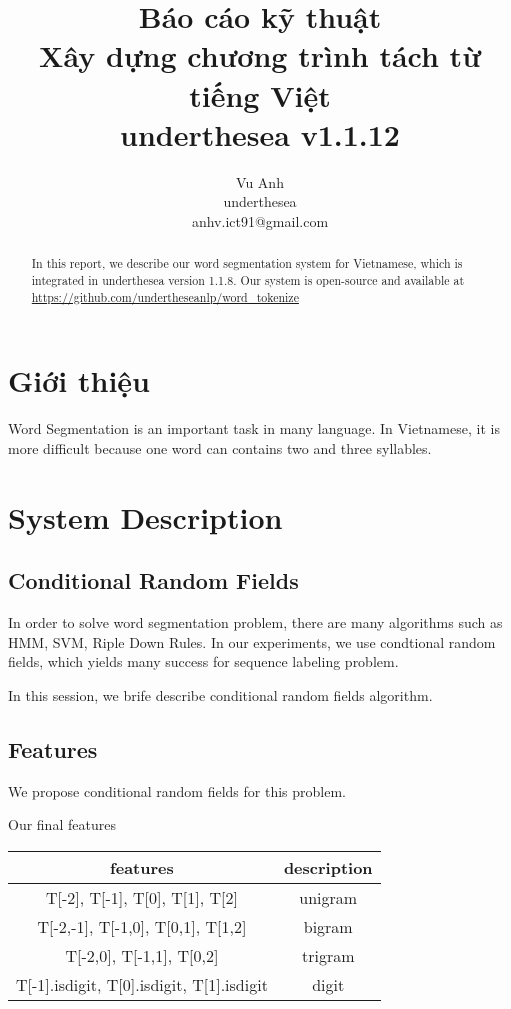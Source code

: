\documentclass[11pt,a4paper]{article}
\title{Báo cáo kỹ thuật\\ Xây dựng chương trình tách từ tiếng Việt \\ underthesea v1.1.12}
\author{
Vu Anh\\
underthesea\\
anhv.ict91@gmail.com
}
\date{}
\begin{document}
\maketitle
\begin{abstract}
In this report, we describe our word segmentation system for Vietnamese, which is integrated in underthesea version 1.1.8.
Our system is open-source and available at \url{https://github.com/undertheseanlp/word_tokenize}

\end{abstract}

\section{Giới thiệu}

Word Segmentation is an important task in many language. In Vietnamese, it is more difficult because one word can contains two and three syllables.


\section{System Description}

\subsection{Conditional Random Fields}

In order to solve word segmentation problem, there are many algorithms such as HMM, SVM, Riple Down Rules. In our experiments, we use condtional random fields, which yields many success for sequence labeling problem.

In this session, we brife describe conditional random fields algorithm.


\subsection{Features}
We propose conditional random fields for this problem.

Our final features
\begin{center}
\begin{tabular}{ |c|c| }
 \hline
 features & description \\
 \hline
 T[-2], T[-1], T[0], T[1], T[2] & unigram  \\
 T[-2,-1], T[-1,0], T[0,1], T[1,2] & bigram  \\
 T[-2,0], T[-1,1], T[0,2] & trigram \\
 T[-1].isdigit, T[0].isdigit, T[1].isdigit & digit
 \hline
\end{tabular}
\end{center}
\end{document}
